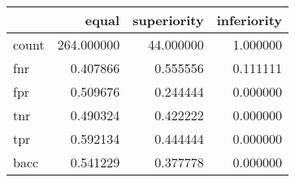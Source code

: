 \begin{tabular}{lrrr}
\toprule
{} &       equal &  superiority &  inferiority \\
\midrule
count &  264.000000 &    44.000000 &     1.000000 \\
fnr   &    0.407866 &     0.555556 &     0.111111 \\
fpr   &    0.509676 &     0.244444 &     0.000000 \\
tnr   &    0.490324 &     0.422222 &     0.000000 \\
tpr   &    0.592134 &     0.444444 &     0.000000 \\
bacc  &    0.541229 &     0.377778 &     0.000000 \\
\bottomrule
\end{tabular}
